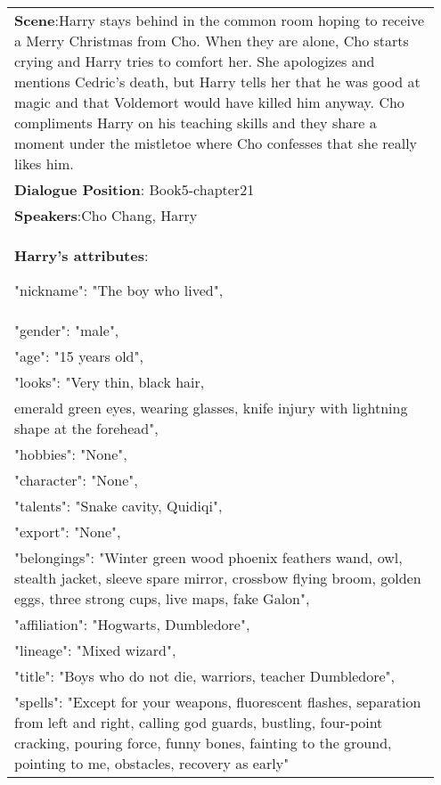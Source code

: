 \documentclass[11pt]{article}
\begin{document}
\begin{table*}[!t]\footnotesize
\centering
\small

\begin{tabular}{p{0.95\linewidth}}


\toprule
\textbf{Scene}:Harry stays behind in the common room hoping to receive a Merry Christmas from Cho. When they are alone, Cho starts crying and Harry tries to comfort her. She apologizes and mentions Cedric's death, but Harry tells her that he was good at magic and that Voldemort would have killed him anyway. Cho compliments Harry on his teaching skills and they share a moment under the mistletoe where Cho confesses that she really likes him. \\
\textbf{Dialogue Position}: Book5-chapter21 \\
\textbf{Speakers}:Cho Chang, Harry \\
\textbf{Harry's attributes}: 

"nickname": "The boy who lived",\\
"gender": "male",\\
"age": "15 years old",\\
"looks": "Very thin, black hair, \\emerald green eyes, wearing glasses, knife injury with lightning shape at the forehead",\\
"hobbies": "None",\\
"character": "None",\\
"talents": "Snake cavity, Quidiqi",\\
"export": "None",\\
"belongings": "Winter green wood phoenix feathers wand, owl, stealth jacket, sleeve spare mirror, crossbow flying broom, golden eggs, three strong cups, live maps, fake Galon",\\
"affiliation": "Hogwarts, Dumbledore",\\
"lineage": "Mixed wizard",\\
"title": "Boys who do not die, warriors, teacher Dumbledore",\\
"spells": "Except for your weapons, fluorescent flashes, separation from left and right, calling god guards, bustling, four-point cracking, pouring force, funny bones, fainting to the ground, pointing to me, obstacles, recovery as early"\\


\end{tabular}
\end{table*}
\end{document}
